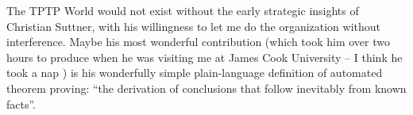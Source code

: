 \documentclass[runningheads]{llncs}
\begin{document}
The TPTP World would not exist without the early strategic insights of Christian Suttner,
with his willingness to let me do the organization without interference. 
Maybe his most wonderful contribution (which took him over two hours to produce when he
was visiting me at James Cook University -- I think he took a nap \smiley) is his 
wonderfully simple plain-language definition of automated theorem proving: 
``the derivation of conclusions that follow inevitably from known facts''.



\end{document}

